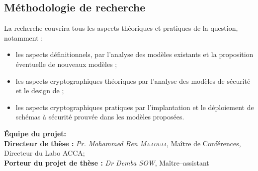\documentclass[twoside,french,11pt]{amsart}
\begin{document}
\subsection{Méthodologie de recherche}
La recherche couvrira tous les aspects théoriques et pratiques de la question, notamment :
\begin{itemize}
	\item les aspects définitionnels, par l'analyse des modèles existants et la proposition éventuelle de nouveaux modèles ;
	\item les aspects cryptographiques théoriques par l'analyse des modèles de sécurité et le design de ;
	\item les aspects cryptographiques pratiques par l'implantation et le déploiement de schémas à sécurité prouvée dans les modèles proposées.
\end{itemize}
\newpage
\LARGE \textbf{Équipe du projet:}\\
\Large \textbf{Directeur de thèse :} \textit{Pr. Mohammed Ben \textsc{Maaouia}}, Maître de Conférences,
Directeur du Labo ACCA;\\
\Large \textbf{Porteur du projet de thèse :} \textit{Dr Demba \textsc{SOW}}, Maître–assistant\\



\vspace{2cm}


\end{document}

